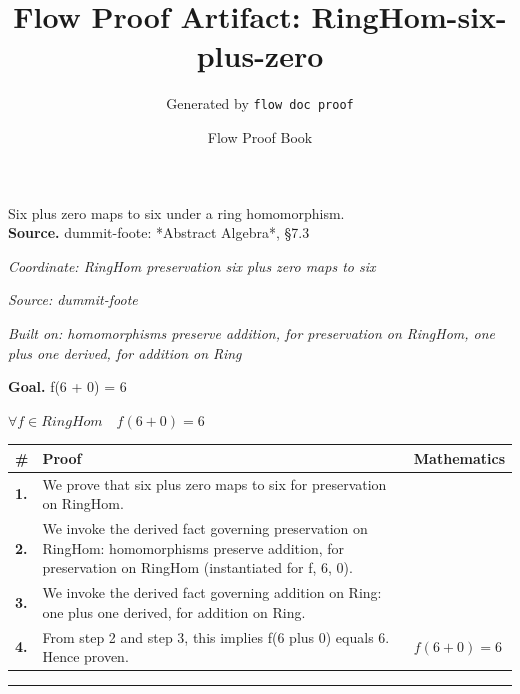 \documentclass[11pt]{article}
\title{Flow Proof Artifact: RingHom-six-plus-zero}
\author{Generated by \texttt{flow doc proof}}
\date{Flow Proof Book}
\theoremstyle{definition}
\begin{document}
\maketitle
Six plus zero maps to six under a ring homomorphism.\\[0.5em]
\textbf{Source.} dummit-foote: *Abstract Algebra*, §7.3\\[0.5em]
\bigskip
{}\par
\smallskip\noindent\textit{Coordinate: RingHom \cdot preservation \cdot six plus zero maps to six}\par
\smallskip\noindent\textit{Source: dummit-foote}\par
\smallskip\noindent\textit{Built on: homomorphisms preserve addition, for preservation on RingHom, one plus one derived, for addition on Ring}\par
\medskip
\noindent\textbf{Goal.} f(6 + 0) = 6\par
\noindent$\displaystyle \forall f \in RingHom\quad f(6 + 0) = 6$\par
\medskip
\noindent
\begin{tabular}{@{} >{\raggedright\arraybackslash}p{} >{\raggedright\arraybackslash}p{} >{\raggedleft\arraybackslash}p{} @{}}
\textbf{\#} & \textbf{Proof} & \textbf{Mathematics} \\
\midrule
\textbf{1.} & We prove that six plus zero maps to six for preservation on RingHom. & \\[0.45em]
\textbf{2.} & We invoke the derived fact governing preservation on RingHom: homomorphisms preserve addition, for preservation on RingHom (instantiated for f, 6, 0). & \\[0.45em]
\textbf{3.} & We invoke the derived fact governing addition on Ring: one plus one derived, for addition on Ring. & \\[0.45em]
\textbf{4.} & From step 2 and step 3, this implies f(6 plus 0) equals 6. Hence proven. & $\displaystyle f(6 + 0) = 6$ \\[0.45em]
\bottomrule
\end{tabular}
\label{thm:RingHom-preservation-six_plus_zero_maps_to_six}
\par\medskip\hrule
\end{document}
